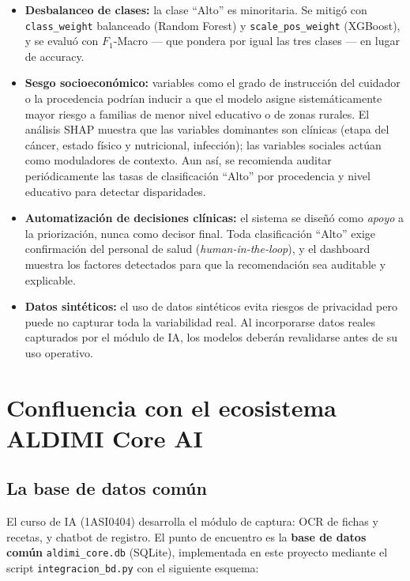 \documentclass[12pt, a4paper]{article}
\begin{document}
\begin{itemize}[leftmargin=1.6em, itemsep=4pt]
  \item \textbf{Desbalanceo de clases:} la clase ``Alto'' es minoritaria. Se mitig\'o con \texttt{class\_weight} balanceado (Random Forest) y \texttt{scale\_pos\_weight} (XGBoost), y se evalu\'o con $F_1$-Macro --- que pondera por igual las tres clases --- en lugar de accuracy.
  \item \textbf{Sesgo socioecon\'omico:} variables como el grado de instrucci\'on del cuidador o la procedencia podr\'ian inducir a que el modelo asigne sistem\'aticamente mayor riesgo a familias de menor nivel educativo o de zonas rurales. El an\'alisis SHAP muestra que las variables dominantes son cl\'inicas (etapa del c\'ancer, estado f\'isico y nutricional, infecci\'on); las variables sociales act\'uan como moduladores de contexto. Aun as\'i, se recomienda auditar peri\'odicamente las tasas de clasificaci\'on ``Alto'' por procedencia y nivel educativo para detectar disparidades.
  \item \textbf{Automatizaci\'on de decisiones cl\'inicas:} el sistema se dise\~n\'o como \emph{apoyo} a la priorizaci\'on, nunca como decisor final. Toda clasificaci\'on ``Alto'' exige confirmaci\'on del personal de salud (\emph{human-in-the-loop}), y el dashboard muestra los factores detectados para que la recomendaci\'on sea auditable y explicable.
  \item \textbf{Datos sint\'eticos:} el uso de datos sint\'eticos evita riesgos de privacidad pero puede no capturar toda la variabilidad real. Al incorporarse datos reales capturados por el m\'odulo de IA, los modelos deber\'an revalidarse antes de su uso operativo.
\end{itemize}

\newpage
\section{Confluencia con el ecosistema ALDIMI Core AI}

\subsection{La base de datos com\'un}

El curso de IA (1ASI0404) desarrolla el m\'odulo de captura: OCR de fichas y recetas, y chatbot de registro. El punto de encuentro es la \textbf{base de datos com\'un} \texttt{aldimi\_core.db} (SQLite), implementada en este proyecto mediante el script \texttt{integracion\_bd.py} con el siguiente esquema:
\end{document}
